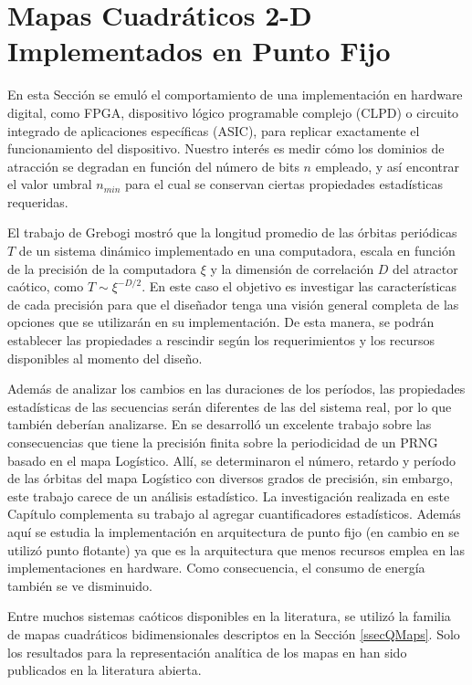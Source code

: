 \section{Mapas Cuadráticos 2-D Implementados en Punto Fijo}
\label{sec:StochDegr}

En esta Sección se emuló el comportamiento de una implementación en hardware digital, como FPGA, dispositivo lógico programable complejo (CLPD) o circuito integrado de aplicaciones específicas (ASIC), para replicar exactamente el funcionamiento del dispositivo.
Nuestro interés es medir cómo los dominios de atracción se degradan en función del número de bits $n$ empleado, y así encontrar el valor umbral $n_{min}$ para el cual se conservan ciertas propiedades estadísticas requeridas.

El trabajo de Grebogi \cite{Grebogi1988} mostró que la longitud promedio de las órbitas periódicas $T$ de un sistema dinámico implementado en una computadora, escala en función de la precisión de la computadora $\xi$ y la dimensión de correlación $D$ del atractor caótico, como $T \sim \xi ^ {- D / 2}$.
En este caso el objetivo es investigar las características de cada precisión para que el diseñador tenga una visión general completa de las opciones que se utilizarán en su implementación.
De esta manera, se podrán establecer las propiedades a rescindir según los requerimientos y los recursos disponibles al momento del diseño.

Además de analizar los cambios en las duraciones de los períodos, las propiedades estadísticas de las secuencias serán diferentes de las del sistema real, por lo que también deberían analizarse.
En \cite{Persohn2012} se desarrolló un excelente trabajo sobre las consecuencias que tiene la precisión finita sobre la periodicidad de un PRNG basado en el mapa Logístico.
Allí, se determinaron el número, retardo y período de las órbitas del mapa Logístico con diversos grados de precisión, sin embargo, este trabajo carece de un análisis estadístico.
La investigación realizada en este Capítulo complementa su trabajo al agregar cuantificadores estadísticos.
Además aquí se estudia la implementación en arquitectura de punto fijo (en cambio en \cite{Persohn2012} se utilizó punto flotante) ya que es la arquitectura que menos recursos emplea en las implementaciones en hardware.
Como consecuencia, el consumo de energía también se ve disminuido.

Entre muchos sistemas caóticos disponibles en la literatura, se utilizó la familia de mapas cuadráticos bidimensionales descriptos en la Sección \ref{ssecQMaps}.
Solo los resultados para la representación analítica de los mapas en \cite{Sprott1993} han sido publicados en la literatura abierta.

